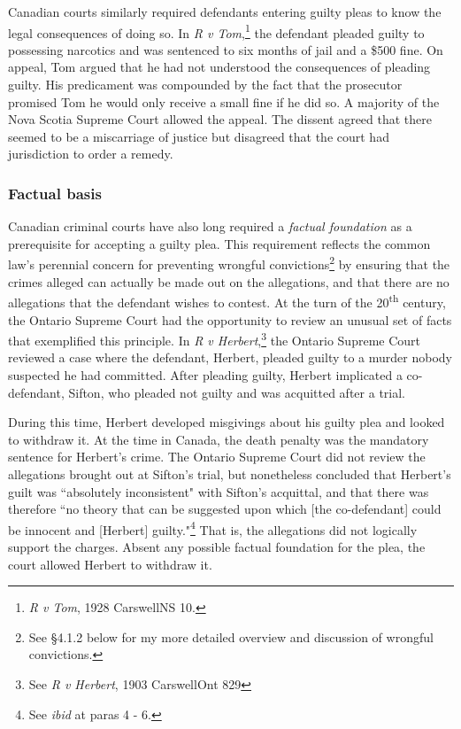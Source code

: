 Canadian courts similarly required defendants entering guilty pleas to know the legal consequences of doing so. In \textit{R v Tom},\footnote{\textit{R v Tom}, 1928 CarswellNS 10.} the defendant pleaded guilty to possessing narcotics and was sentenced to six months of jail and a \$500 fine. On appeal, Tom argued that he had not understood the consequences of pleading guilty. His predicament was compounded by the fact that the prosecutor promised Tom he would only receive a small fine if he did so. A majority of the Nova Scotia Supreme Court allowed the appeal. The dissent agreed that there seemed to be a miscarriage of justice but disagreed that the court had jurisdiction to order a remedy. 

\subsubsection{Factual basis}

Canadian criminal courts have also long required a \textit{factual foundation} as a prerequisite for accepting a guilty plea. This requirement reflects the common law's perennial concern for preventing wrongful convictions\footnote{See \S 4.1.2 below for my more detailed overview and discussion of wrongful convictions.} by ensuring that the crimes alleged can actually be made out on the allegations, and that there are no allegations that the defendant wishes to contest. At the turn of the 20\textsuperscript{th} century, the Ontario Supreme Court had the opportunity to review an unusual set of facts that exemplified this principle. In \textit{R v Herbert},\footnote{See \textit{R v Herbert}, 1903 CarswellOnt 829} the Ontario Supreme Court reviewed a case where the defendant, Herbert, pleaded guilty to a murder nobody suspected he had committed. After pleading guilty, Herbert implicated a co-defendant, Sifton, who pleaded not guilty and was acquitted after a trial. 

During this time, Herbert developed misgivings about his guilty plea and looked to withdraw it. At the time in Canada, the death penalty was the mandatory sentence for Herbert's crime. The Ontario Supreme Court did not review the allegations brought out at Sifton's trial, but nonetheless concluded that Herbert's guilt was ``absolutely inconsistent" with Sifton's acquittal, and that there was therefore ``no theory that can be suggested upon which [the co-defendant] could be innocent and [Herbert] guilty."\footnote{See \textit{ibid} at paras 4 - 6.} That is, the allegations did not logically support the charges. Absent any possible factual foundation for the plea, the court allowed Herbert to withdraw it.

